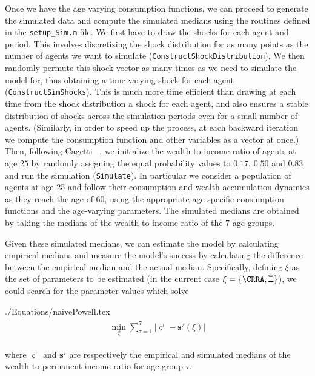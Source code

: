 \documentclass[titlepage, headings=optiontotocandhead]{\econtex}
\begin{document}
Once we have the age varying consumption functions, we can proceed to
generate the simulated data and compute the simulated medians using
the routines defined in the \texttt{setup\_Sim.m} file. We first have
to draw the shocks for each agent and period. This involves
discretizing the shock distribution for as many points as the number
of agents we want to simulate
(\texttt{ConstructShockDistribution}). We then randomly permute this
shock vector as many times as we need to simulate the model for, thus
obtaining a time varying shock for each agent
(\texttt{ConstructSimShocks}). This is much more time efficient than
drawing at each time from the shock distribution a shock for each
agent, and also ensures a stable distribution of shocks across the
simulation periods even for a small number of agents. (Similarly, in
order to speed up the process, at each backward iteration we compute
the consumption function and other variables as a vector at once.)
Then, following Cagetti ~\citeyearpar{cagettiWprofiles}, we
initialize the wealth-to-income ratio of agents at age $25$ by
randomly assigning the equal probability values to $0.17$, $0.50$ and
$0.83$ and run the simulation (\texttt{Simulate}). In particular we
consider a population of agents at age 25 and follow their consumption
and wealth accumulation dynamics as they reach the age of $60$, using
the appropriate age-specific consumption functions and the age-varying
parameters. The simulated medians are obtained by taking the medians
of the wealth to income ratio of the $7$ age groups.

Given these simulated medians, we can estimate the model by
calculating empirical medians and measure the model's success
by calculating the difference between the empirical median and the
actual median.  Specifically, defining $\xi$ as the set of parameters
to be estimated (in the current case $\xi =\{\CRRA ,{\beth}\}$), we could search for
the parameter values which solve
\begin{verbatimwrite}{./Equations/naivePowell.tex}
  \begin{equation}
    \begin{gathered}
      \begin{aligned}
        \min_{\xi} \sum_{\tau=1}^{7} |\varsigma^{\tau} -\mathbf{s}^{\tau}(\xi)|  \label{eq:naivePowell}
      \end{aligned}
    \end{gathered}
  \end{equation}
\end{verbatimwrite}
\unskip
where $\varsigma^{\tau }$ and $\mathbf{s}^{\tau}$ are respectively the empirical and simulated medians of the wealth to permanent income ratio for age group $\tau $.
\end{document}
